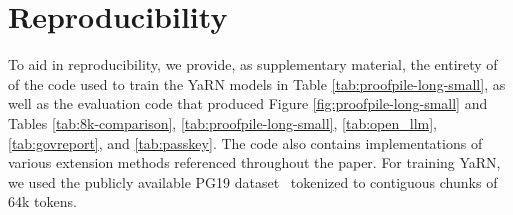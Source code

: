 \section{Reproducibility}

To aid in reproducibility, we provide, as supplementary material, the entirety of of the code used to train the YaRN models in Table \ref{tab:proofpile-long-small}, as well as the evaluation code that produced Figure \ref{fig:proofpile-long-small} and Tables \ref{tab:8k-comparison}, \ref{tab:proofpile-long-small}, \ref{tab:open_llm}, \ref{tab:govreport}, and \ref{tab:passkey}. The code also contains implementations of various extension methods referenced throughout the paper. For training YaRN, we used the publicly available PG19 dataset~\citep{Rae2020Compressive} tokenized to contiguous chunks of 64k tokens.


